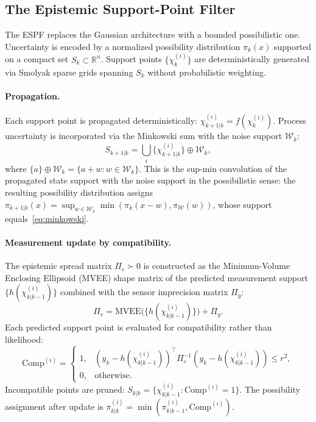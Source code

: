 \documentclass[12pt]{article}
\newcommand{\R}{\mathbb{R}}
\begin{document}
\subsection{The Epistemic Support-Point Filter}

The ESPF \cite{jah2025espf,jah2026optimality} replaces the Gaussian architecture
with a bounded possibilistic one.
Uncertainty is encoded by a normalized possibility distribution $\pi_k(x)$
supported on a compact set $S_k\subset\R^n$.
Support points $\{\chi^{(i)}_k\}$ are deterministically generated via Smolyak
sparse grids spanning $S_k$ without probabilistic weighting.

\paragraph{Propagation.}
Each support point is propagated deterministically: $\chi^{(i)}_{k+1|k}=f(\chi^{(i)}_k)$.
Process uncertainty is incorporated via the Minkowski sum with the noise
support $\mathcal{W}_k$:
\begin{equation}
S_{k+1|k} = \bigcup_i \bigl\{\chi^{(i)}_{k+1|k}\bigr\} \oplus \mathcal{W}_k,
\label{eq:minkowski}
\end{equation}
where $\{a\}\oplus\mathcal{W}_k = \{a+w : w\in\mathcal{W}_k\}$.
This is the sup-min convolution of the propagated state support with the noise
support in the possibilistic sense: the resulting possibility distribution assigns
$\pi_{k+1|k}(x)=\sup_{w\in\mathcal{W}_k}\min(\pi_k(x-w),\pi_{\mathcal{W}}(w))$,
whose support equals~\eqref{eq:minkowski}.

\paragraph{Measurement update by compatibility.}
The epistemic spread matrix $\Pi_e\succ 0$ is constructed as the
Minimum-Volume Enclosing Ellipsoid (MVEE) shape matrix of the predicted
measurement support $\{h(\chi^{(i)}_{k|k-1})\}$ combined with the sensor
imprecision matrix $\Pi_y$:
\begin{equation}
\Pi_e = \mathrm{MVEE}\bigl(\{h(\chi^{(i)}_{k|k-1})\}\bigr) + \Pi_y.
\label{eq:Pi_e}
\end{equation}
Each predicted support point is evaluated for compatibility rather than likelihood:
\begin{equation}
\mathrm{Comp}^{(i)} = \begin{cases}
1, & (y_k - h(\chi^{(i)}_{k|k-1}))^\top \Pi_e^{-1}
     (y_k - h(\chi^{(i)}_{k|k-1})) \le r^2, \\
0, & \text{otherwise.}
\end{cases}
\label{eq:compat}
\end{equation}
Incompatible points are pruned: $S_{k|k}=\{\chi^{(i)}_{k|k-1} : \mathrm{Comp}^{(i)}=1\}$.
The possibility assignment after update is $\pi^{(i)}_{k|k}=\min(\pi^{(i)}_{k|k-1},\mathrm{Comp}^{(i)})$.
\end{document}
